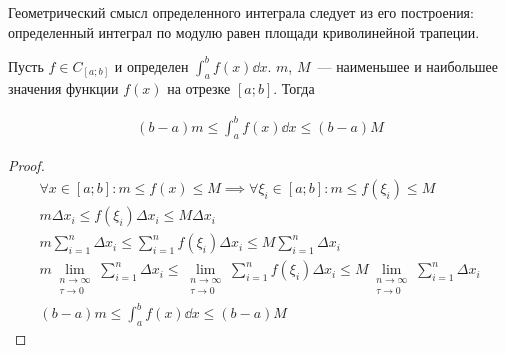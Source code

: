 
Геометрический смысл определенного интеграла следует из его построения:
определенный интеграл по модулю равен площади криволинейной трапеции.

\begin{lemma}\label{int-est}
  Пусть \(f \in C_{[a;b]}\) и определен \(\int_{a}^{b} f(x) \dd x\).
  \(m\), \(M\)~--- наименьшее и наибольшее значения функции \(f(x)\) на
  отрезке \([a;b]\). Тогда

  \begin{align*}
    (b - a) m \le \int_{a}^{b} f(x) \dd x \le (b - a) M
  \end{align*}
\end{lemma}
\begin{proof}
  \begin{align*}
    \forall x \in [a;b] \colon m \le f(x) \le M
    \implies \forall \xi_{i} \in [a;b] \colon m \le f(\xi_{i}) \le M
    \\
    m \Delta x_{i} \le f(\xi_{i}) \Delta x_{i} \le M \Delta x_{i}
    \\
      m \sum_{i = 1}^{n} \Delta x_{i}
    \le 
      \sum_{i = 1}^{n} f(\xi_{i}) \Delta x_{i}
    \le 
      M \sum_{i = 1}^{n} \Delta x_{i}
    \\
      m \lim_{\substack{n \to \infty \\ \tau \to 0}}
      \sum_{i = 1}^{n} \Delta x_{i}
    \le 
      \lim_{\substack{n \to \infty \\ \tau \to 0}}
      \sum_{i = 1}^{n} f(\xi_{i}) \Delta x_{i}
    \le 
      M \lim_{\substack{n \to \infty \\ \tau \to 0}}
      \sum_{i = 1}^{n} \Delta x_{i}
    \\
    (b - a) m \le \int_{a}^{b} f(x) \dd x \le (b - a) M
  \end{align*}
\end{proof}

